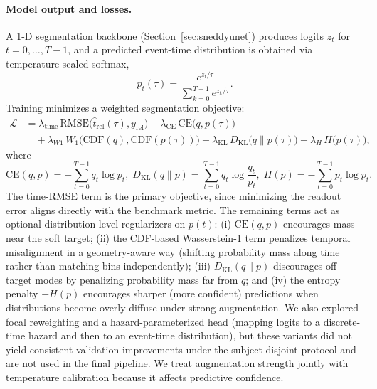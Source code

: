 \documentclass[12pt]{article}
\begin{document}
\paragraph{Model output and losses.}
A 1-D segmentation backbone (Section~\ref{sec:sneddyunet}) produces logits $z_t$ for $t=0,\dots,T-1$, and a predicted
event-time distribution is obtained via temperature-scaled softmax,
\begin{equation}
\label{eq:rt_pred_dist}
p_t(\tau)=\frac{e^{z_t/\tau}}{\sum_{k=0}^{T-1} e^{z_k/\tau}}.
\end{equation}
Training minimizes a weighted segmentation objective:
\begin{equation}
\label{eq:rt_loss}
\begin{aligned}
\mathcal{L}
&= \lambda_{\text{time}}\,\mathrm{RMSE}\big(\hat t_{\mathrm{rel}}(\tau), y_{\mathrm{rel}}\big)
 + \lambda_{\text{CE}}\,\mathrm{CE}\big(q, p(\tau)\big) \\
&\quad + \lambda_{W1}\,W_1\big(\mathrm{CDF}(q), \mathrm{CDF}(p(\tau))\big)
 + \lambda_{\text{KL}}\,D_{\mathrm{KL}}\big(q\|p(\tau)\big)
 - \lambda_{H}\,H\big(p(\tau)\big),
\end{aligned}
\end{equation}
where  
\begin{equation*}
\mathrm{CE}(q,p)=-\sum_{t=0}^{T-1} q_t \log p_t, \;
D_{\mathrm{KL}}(q\|p)=\sum_{t=0}^{T-1} q_t \log\frac{q_t}{p_t}, \;
H(p)=-\sum_{t=0}^{T-1} p_t \log p_t.
\end{equation*}
The time-RMSE term is the primary objective, since minimizing the readout error aligns directly with the benchmark metric. The remaining terms act as optional distribution-level regularizers on $p(t)$: (i) $\mathrm{CE}(q,p)$ encourages mass near the soft target; (ii) the CDF-based Wasserstein-1 term penalizes temporal
misalignment in a geometry-aware way (shifting probability mass along time rather than matching bins independently); (iii) $D_{\mathrm{KL}}(q\|p)$ discourages off-target modes by penalizing probability mass far from $q$; and
(iv) the entropy penalty $-H(p)$ encourages sharper (more confident) predictions when distributions become overly diffuse under strong
augmentation. We also explored focal reweighting and a hazard-parameterized head (mapping logits to a discrete-time hazard
and then to an event-time distribution), but these variants did not yield consistent validation improvements under the
subject-disjoint protocol and are not used in the final pipeline. We treat augmentation strength jointly with temperature calibration because it affects predictive confidence.
\end{document}
